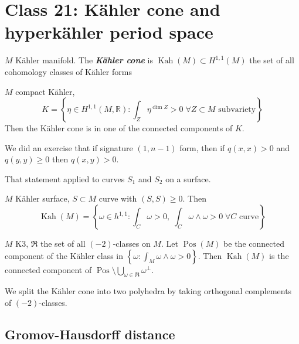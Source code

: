 \section{Class 21: Kähler cone and hyperkähler period space}

\begin{defn}\leavevmode
	$M$ Kähler manifold. The \textit{\textbf{Kähler cone}} is $\operatorname{Kah}(M)\subset H^{1,1}(M)$ the set of all cohomology classes of Kähler forms
\end{defn}

\begin{thm}[Demailly-Pa\u n]\leavevmode
$M$ compact Kähler,
\[K=\left\{\eta \in H^{1,1}(M,\mathbb{R}):\int_{Z}\eta^{\dim Z}>0 \;\forall Z\subset M\text{ subvariety} \right\}\]
Then the Kähler cone is in one of the connected components of $K$.
\end{thm}

\begin{exercise}\leavevmode
	We did an exercise that if signature $(1,n-1)$ form, then  if  $q(x,x)>0$ and  $q(y,y)\geq 0$ then $q(x,y)>0$.
\end{exercise}

\begin{coro}\leavevmode
	That statement applied to curves $S_1$ and $S_2$ on a surface.
\end{coro}

\begin{thm}\leavevmode
	$M$ Kähler surface, $S \subset M$ curve with $(S,S) \geq  0$. Then
	\[\operatorname{Kah}(M)=\left\{ \omega \in h^{1,1}: \int_{C} \omega>0,\; \int_{C}\omega\wedge \omega>0\; \forall C\text{ curve} \right\}\]
\end{thm}

\begin{thm}\leavevmode
$M$ K3, $\mathfrak{R}$ the set of all $(-2)$-classes on $M$. Let $\operatorname{Pos}(M)$ be the connected component of the Kähler class in $\left\{ \omega:\int_{M}\omega \wedge\omega>0 \right\} $. Then $\operatorname{Kah}(M)$ is the connected component of $\operatorname{Pos}\setminus \bigcup_{\omega \in \mathfrak{ R}} \omega^\perp$.

{\color{3}We split the Kähler cone into two polyhedra by taking orthogonal complements of $(-2)$-classes.}
\end{thm}

\subsection{Gromov-Hausdorff distance}

